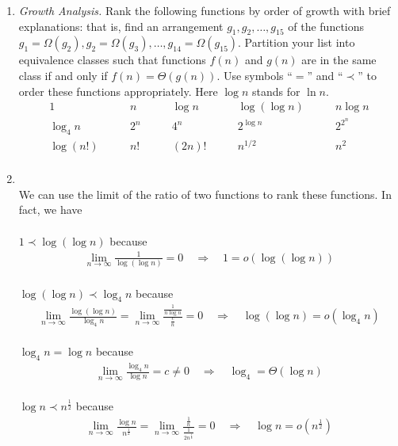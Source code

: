 \documentclass[12pt,a4paper]{article}
\makeatletter
\newtheorem*{solution}{Solution}
\theoremstyle{definition}
\renewenvironment{solution}[1][Solution] {\par\pushQED{\qed}\normalfont\topsep6\p@\@plus6\p@\relax\trivlist\item[\hskip\labelsep\bfseries#1\@addpunct{.}]\ignorespaces}{\popQED\endtrivlist\@endpefalse} \makeatother
\makeatother
\begin{document}
\begin{enumerate}
\item \textit{Growth Analysis.} Rank the following functions by order of growth with brief explanations: that is, find an arrangement $g_1, g_2, \ldots , g_{15}$ of the functions $g_1 = \Omega(g_2), g_2 = \Omega(g_3), \ldots, g_{14} = \Omega(g_{15})$.  Partition your list into equivalence classes such that functions $f(n)$ and $g(n)$ are in the same class if and only if $f(n) = \Theta(g(n))$. Use symbols ``$=$'' and ``$\prec$'' to order these functions appropriately. Here $\log n$ stands for $\ln n$.
$$
\begin{array}{ccccc}
	1 \quad & \quad n \quad & \quad \log n \quad & \quad \log (\log n) \quad & \quad n \log n \\
	\log_4 n \quad & \quad 2^n \quad & \quad 4^n \quad & \quad 2^{\log n} \quad & \quad 2^{2^n} \\
	\log (n!) \quad & \quad n! \quad & \quad (2n)! \quad & \quad  n^{1/2} \quad & \quad n^2 \\
\end{array}
$$
    \begin{solution}
      ~\\
      We can use the limit of the ratio of two functions to rank these functions. In fact, we have\\
      ~\\
      $1\prec\log (\log n)$ because
      \begin{align}
          \lim_{n\to \infty}\frac{1}{\log (\log n)} = 0 \quad\Rightarrow\quad 1 = o(\log (\log n))
      \end{align}
      ~\\
      $\log (\log n)\prec\log_4 n$ because
      \begin{align}
          \lim_{n\to \infty}\frac{\log (\log n)}{\log_4 n} = \lim_{n\to \infty}\frac{\frac{1}{n\log n}}{\frac{c}{n}}  =0 \quad\Rightarrow\quad \log (\log n) = o(\log_4 n)
      \end{align}
      ~\\
      $\log_4 n=\log n$ because
      \begin{align}
          \lim_{n\to \infty}\frac{\log_4 n}{\log n} = c\neq 0 \quad\Rightarrow\quad \log_4 = \Theta(\log n)
      \end{align}
      ~\\
      $\log n\prec n^{\frac{1}{2}}$ because
      \begin{align}
          \lim_{n\to \infty}\frac{\log n}{n^{\frac{1}{2}}} =\lim_{n\to \infty}\frac{\frac{1}{n}}{\frac{1}{2n^{\frac{1}{2}}}}= 0 \quad\Rightarrow\quad \log n = o(n^{\frac{1}{2}})

\end{align}
\end{solution}
\end{enumerate}
\end{document}
